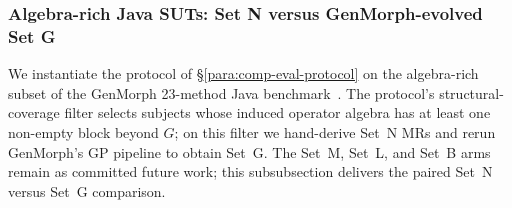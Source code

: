 %
%
%

\subsubsection{Algebra-rich Java SUTs: Set N versus GenMorph-evolved Set G}
\label{subsec:d4j-algebra-rich}

We instantiate the protocol of \S\ref{para:comp-eval-protocol} on the
algebra-rich subset of the GenMorph 23-method Java
benchmark~\cite{Ayerdi2023GenMorph}. The protocol's structural-coverage
filter selects subjects whose induced operator algebra has at least one
non-empty block beyond $G$; on this filter we hand-derive Set~N MRs and
rerun GenMorph's GP pipeline to obtain Set~G. The Set~M, Set~L, and
Set~B arms remain as committed future work; this subsubsection
delivers the paired Set~N versus Set~G comparison.

